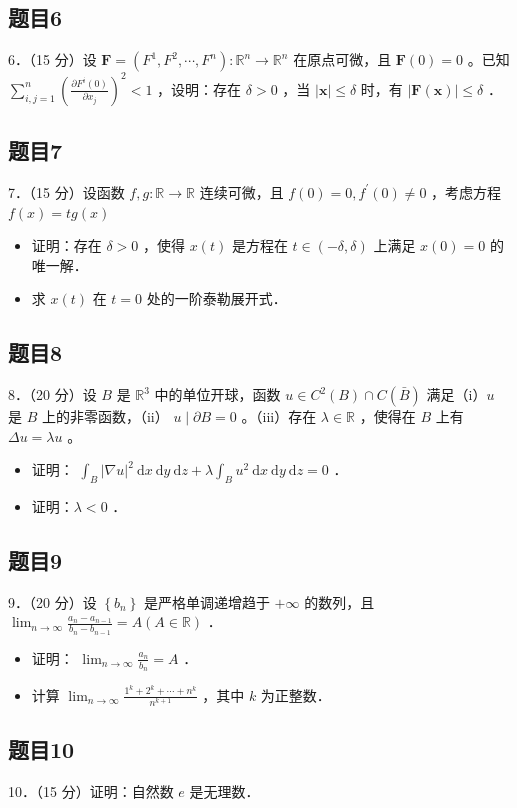 \documentclass{article}
\begin{document}
\subsection{题目6}
6．（15 分）设 \(\mathbf{F}=\left(F^{1}, F^{2}, \cdots, F^{n}\right): \mathbb{R}^{n} \rightarrow \mathbb{R}^{n}\) 在原点可微，且 \(\mathbf{F}(0)=0\) 。已知 \(\sum_{i, j=1}^{n}\left(\frac{\partial F^{i}(0)}{\partial x_{j}}\right)^{2}<1\) ，设明：存在 \(\delta>0\) ，当 \(|\mathbf{x}| \leq \delta\) 时，有 \(|\mathbf{F}(\mathbf{x})| \leq \delta\) ．

\subsection{题目7}
7．（15 分）设函数 \(f, g: \mathbb{R} \rightarrow \mathbb{R}\) 连续可微，且 \(f(0)=0, f^{\prime}(0) \neq 0\) ，考虑方程 \(f(x)=t g(x)\)

\begin{itemize}
  \item[（1）] 证明：存在 \(\delta>0\) ，使得 \(x(t)\) 是方程在 \(t \in(-\delta, \delta)\) 上满足 \(x(0)=0\) 的唯一解．
  \item[（2）] 求 \(x(t)\) 在 \(t=0\) 处的一阶泰勒展开式．
\end{itemize}

\subsection{题目8}
8．（20 分）设 \(B\) 是 \(\mathbb{R}^{3}\) 中的单位开球，函数 \(u \in C^{2}(B) \cap C(\bar{B})\) 满足（i）\(u\) 是 \(B\) 上的非零函数，（ii） \(u \mid \partial B=0\) 。（iii）存在 \(\lambda \in \mathbb{R}\) ，使得在 \(B\) 上有 \(\Delta u=\lambda u\) 。

\begin{itemize}
  \item[（1）] 证明： \(\int_{B}|\nabla u|^{2} \mathrm{~d} x \mathrm{~d} y \mathrm{~d} z+\lambda \int_{B} u^{2} \mathrm{~d} x \mathrm{~d} y \mathrm{~d} z=0\) ．
  \item[（2）] 证明：\(\lambda<0\) ．
\end{itemize}

\subsection{题目9}
9．（20 分）设 \(\left\{b_{n}\right\}\) 是严格单调递增趋于 \(+\infty\) 的数列，且 \(\lim _{n \rightarrow \infty} \frac{a_{n}-a_{n-1}}{b_{n}-b_{n-1}}=A(A \in \mathbb{R})\) ．

\begin{itemize}
  \item[（1）] 证明： \(\lim _{n \rightarrow \infty} \frac{a_{n}}{b_{n}}=A\) ．
  \item[（2）] 计算 \(\lim _{n \rightarrow \infty} \frac{1^{k}+2^{k}+\cdots+n^{k}}{n^{k+1}}\) ，其中 \(k\) 为正整数．
\end{itemize}

\subsection{题目10}
10．（15 分）证明：自然数 \(e\) 是无理数．
\end{document}
